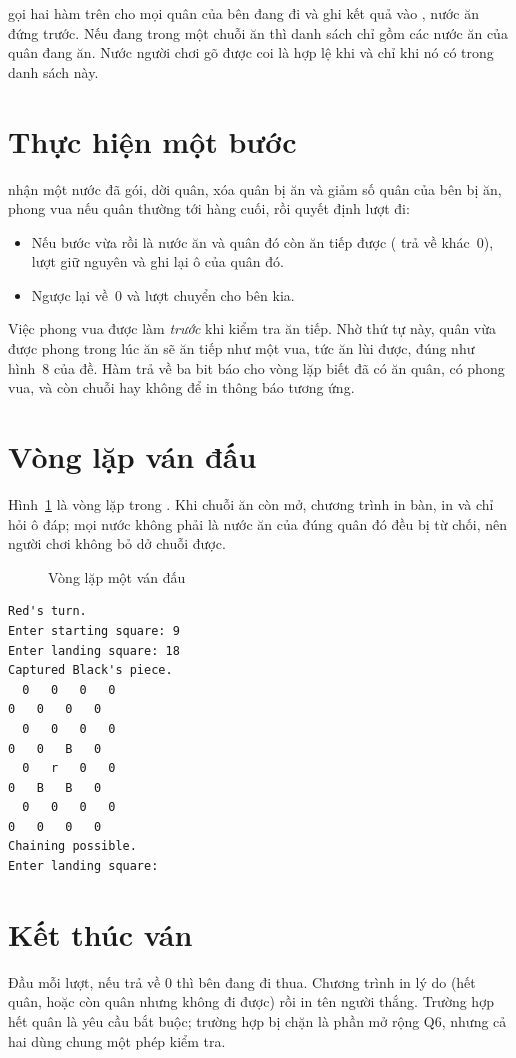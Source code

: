  gọi hai hàm trên cho mọi quân của bên đang đi và ghi kết quả vào , nước ăn đứng trước. Nếu đang trong một chuỗi ăn thì danh sách chỉ gồm các nước ăn của quân đang ăn. Nước người chơi gõ được coi là hợp lệ khi và chỉ khi nó có trong danh sách này.

\section{Thực hiện một bước}

 nhận một nước đã gói, dời quân, xóa quân bị ăn và giảm số quân của bên bị ăn, phong vua nếu quân thường tới hàng cuối, rồi quyết định lượt đi:

\begin{itemize}
\item Nếu bước vừa rồi là nước ăn và quân đó còn ăn tiếp được ( trả về khác~0), lượt giữ nguyên và  ghi lại ô của quân đó.
\item Ngược lại  về~0 và lượt chuyển cho bên kia.
\end{itemize}

Việc phong vua được làm \emph{trước} khi kiểm tra ăn tiếp. Nhờ thứ tự này, quân vừa được phong trong lúc ăn sẽ ăn tiếp như một vua, tức ăn lùi được, đúng như hình~8 của đề. Hàm trả về ba bit báo cho vòng lặp biết đã có ăn quân, có phong vua, và còn chuỗi hay không để in thông báo tương ứng.

\section{Vòng lặp ván đấu}

Hình~\ref{fig:loop} là vòng lặp trong . Khi chuỗi ăn còn mở, chương trình in bàn, in  và chỉ hỏi ô đáp; mọi nước không phải là nước ăn của đúng quân đó đều bị từ chối, nên người chơi không bỏ dở chuỗi được.

\begin{figure}[ht]
\centering

\caption{Vòng lặp một ván đấu}\label{fig:loop}
\end{figure}

\begin{lstlisting}[style=screen,caption={Ví dụ ăn chuỗi của đề: Đỏ đi 9x18 rồi phải ăn tiếp}]
Red's turn.
Enter starting square: 9
Enter landing square: 18
Captured Black's piece.
  0   0   0   0
0   0   0   0
  0   0   0   0
0   0   B   0
  0   r   0   0
0   B   B   0
  0   0   0   0
0   0   0   0
Chaining possible.
Enter landing square:
\end{lstlisting}

\section{Kết thúc ván}

Đầu mỗi lượt, nếu  trả về 0 thì bên đang đi thua. Chương trình in lý do (hết quân, hoặc còn quân nhưng không đi được) rồi in tên người thắng. Trường hợp hết quân là yêu cầu bắt buộc; trường hợp bị chặn là phần mở rộng Q6, nhưng cả hai dùng chung một phép kiểm tra.
